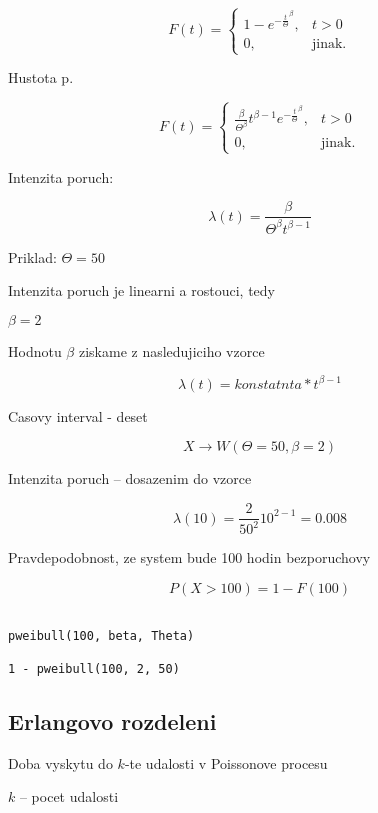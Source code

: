 \documentclass{article}
\begin{document}
\begin{equation}
    F(t)=\begin{cases}
        1 - e^{-\frac{t}{\Theta}^\beta}, & t > 0\\
        0, & \text{jinak}.
  \end{cases}
\end{equation}

Hustota p.

\begin{equation}
    F(t)=\begin{cases}
        \frac{\beta}{\Theta^{\beta}} t^{\beta - 1} e^{-\frac{t}{\Theta}^\beta}, & t > 0\\
        0, & \text{jinak}.
  \end{cases}
\end{equation}

Intenzita poruch:

\[ \lambda(t) = \frac{\beta}{\Theta^\beta t^{\beta - 1}} \]

Priklad:
$\Theta = 50$

Intenzita poruch je linearni a rostouci, tedy

$\beta = 2$

Hodnotu $\beta$ ziskame z nasledujiciho vzorce

\[ \lambda(t) = konstatnta * t^{\beta - 1} \]

Casovy interval - deset

\[ X \rightarrow W(\Theta = 50, \beta = 2) \]

Intenzita poruch -- dosazenim do vzorce

\[ \lambda(10) = \frac{2}{50^2} 10^{2-1} = 0.008 \]

Pravdepodobnost, ze system bude 100 hodin bezporuchovy

\[ P(X > 100) = 1 - F(100) \]

\begin{verbatim}

pweibull(100, beta, Theta)

1 - pweibull(100, 2, 50)

\end{verbatim}

\subsection{Erlangovo rozdeleni}

Doba vyskytu do $k$-te udalosti v Poissonove procesu

$k$ -- pocet udalosti
\end{document}
